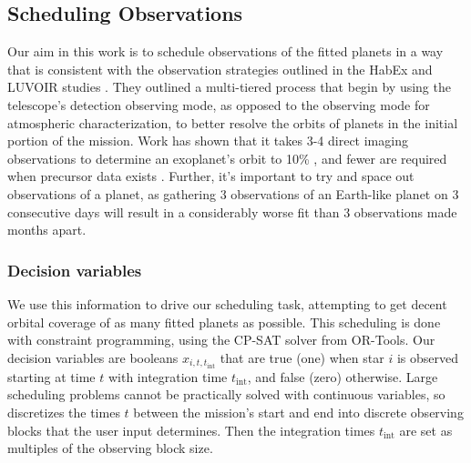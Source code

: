 \subsection{Scheduling Observations}

Our aim in this work is to schedule observations of the fitted planets in a way
that is consistent with the observation strategies outlined in the HabEx and
LUVOIR studies \cite{gaudiHabitableExoplanetObservatory2020,TheLUVOIRTeam2019}.
They outlined a multi-tiered process that begin by using the telescope's
detection observing mode, as opposed to the observing mode for atmospheric
characterization, to better resolve the orbits of planets in the initial
portion of the mission. Work has shown that it takes 3-4 direct imaging
observations to determine an exoplanet's orbit to 10\%
\citep{bluntOrbitsImpatient2017}, and fewer are required when precursor data
exists \citep{gaudiHabitableExoplanetObservatory2020}. Further, it's important
to try and space out observations of a planet, as gathering 3 observations of
an Earth-like planet on 3 consecutive days will result in a considerably worse
fit than 3 observations made months apart.

\subsubsection{Decision variables}

We use this information to drive our scheduling task, attempting to get decent
orbital coverage of as many fitted planets as possible. This scheduling is done
with constraint programming, using the CP-SAT solver from
OR-Tools\citep{perronORTools2022}. Our decision variables are booleans $x_{i,
t, t_{\textrm{int}}}$ that are true (one) when star $i$ is observed starting at
time $t$ with integration time $t_{\textrm{int}}$, and false (zero) otherwise.
Large scheduling problems cannot be practically solved with continuous
variables, so  discretizes the times $t$ between the mission's start
and end into discrete observing blocks that the user input determines. Then the
integration times $t_{\textrm{int}}$ are set as multiples of the observing
block size. 

